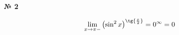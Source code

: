 \documentclass{article}
\begin{document}
\textbf{№ 2} 

$$ \lim\limits_{x\to \pi -} \left( \sin^2{x} \right)^{\tg{\frac{x}{2}}}
= 0^{\infty}
= 0 $$
\end{document}
